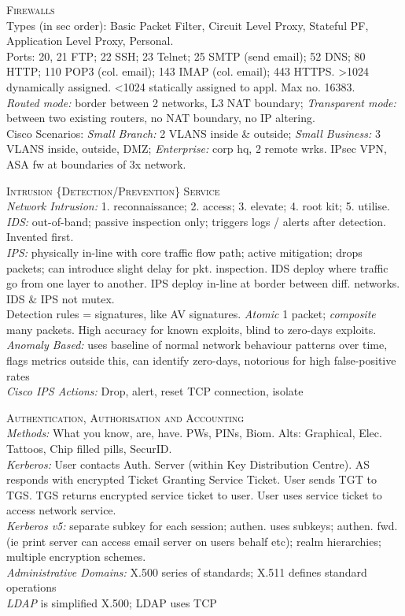 \documentclass[a4paper, 9pt]{article}
\begin{document}
\textsc{Firewalls}\\
Types (in sec order): Basic Packet Filter, Circuit Level Proxy, Stateful PF, Application Level Proxy, Personal. \\
Ports: 20, 21 FTP; 22 SSH; 23 Telnet; 25 SMTP (send email); 52 DNS; 80 HTTP; 110 POP3 (col. email); 143 IMAP (col. email); 443 HTTPS. \textgreater 1024 dynamically assigned. \textless 1024 statically assigned to appl. Max no. 16383. \\
\textit{Routed mode:} border between 2 networks, L3 NAT boundary; \textit{Transparent mode:} between two existing routers, no NAT boundary, no IP altering.\\
Cisco Scenarios: \textit{Small Branch:} 2 VLANS inside \& outside; \textit{Small Business:} 3 VLANS inside, outside, DMZ; \textit{Enterprise:} corp hq, 2 remote wrks. IPsec VPN, ASA fw at boundaries of 3x network.

\textsc{Intrusion \{Detection/Prevention\} Service}\\
\textit{Network Intrusion:} 1. reconnaissance; 2. access; 3. elevate; 4. root kit; 5. utilise.\\
\textit{IDS:} out-of-band; passive inspection only; triggers logs / alerts after detection. Invented first.\\
\textit{IPS:} physically in-line with core traffic flow path; active mitigation; drops packets; can introduce slight delay for pkt. inspection.
IDS deploy where traffic go from one layer to another. IPS deploy in-line at border between diff. networks. IDS \& IPS not mutex.\\
Detection rules = signatures, like AV signatures. \textit{Atomic} 1 packet; \textit{composite} many packets. High accuracy for known exploits, blind to zero-days exploits. \textit{Anomaly Based:} uses baseline of normal network behaviour patterns over time, flags metrics outside this, can identify zero-days, notorious for high false-positive rates\\
\textit{Cisco IPS Actions:} Drop, alert, reset TCP connection, isolate

\textsc{Authentication, Authorisation and Accounting}\\
\textit{Methods:} What you know, are, have. PWs, PINs, Biom. Alts: Graphical, Elec. Tattoos, Chip filled pills, SecurID. \\
\textit{Kerberos:} User contacts Auth. Server (within Key Distribution Centre). AS responds with encrypted Ticket Granting Service Ticket. User sends TGT to TGS. TGS returns encrypted service ticket to user. User uses service ticket to access network service.\\
\textit{Kerberos v5:} separate subkey for each session; authen. uses subkeys; authen. fwd. (ie print server can access email server on users behalf etc); realm hierarchies; multiple encryption schemes.\\
\textit{Administrative Domains:} X.500 series of standards; X.511 defines standard operations\\
\textit{LDAP} is simplified X.500; LDAP uses TCP
\end{document}
